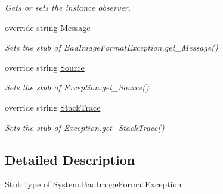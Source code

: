\begin{DoxyCompactItemize}
\begin{DoxyCompactList}\small\item\em Gets or sets the instance observer.\end{DoxyCompactList}\item 
override string \hyperlink{class_system_1_1_fakes_1_1_stub_bad_image_format_exception_a658c67c5a6fc4569af690a0045d67251}{Message}
\begin{DoxyCompactList}\small\item\em Sets the stub of Bad\-Image\-Format\-Exception.\-get\-\_\-\-Message()\end{DoxyCompactList}\item 
override string \hyperlink{class_system_1_1_fakes_1_1_stub_bad_image_format_exception_a42d0f502aa004a55deeac8b57a895e40}{Source}
\begin{DoxyCompactList}\small\item\em Sets the stub of Exception.\-get\-\_\-\-Source()\end{DoxyCompactList}\item 
override string \hyperlink{class_system_1_1_fakes_1_1_stub_bad_image_format_exception_a298eaf372f6d7e0172955fee217cba8c}{Stack\-Trace}
\begin{DoxyCompactList}\small\item\em Sets the stub of Exception.\-get\-\_\-\-Stack\-Trace()\end{DoxyCompactList}\end{DoxyCompactItemize}


\subsection{Detailed Description}
Stub type of System.\-Bad\-Image\-Format\-Exception



